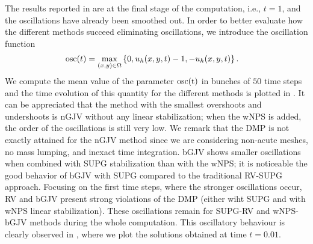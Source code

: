 The results reported in  are at the final stage of the computation, i.e., $t=1$, and the oscillations have already been smoothed out. In order to better evaluate how the different methods succeed eliminating oscillations, we introduce the oscillation function
\begin{align*}
&{\rm osc}(t) = \max_{(x,y)\in \Omega} \left\{0 , u_h(x,y,t) - 1 , -u_h(x,y,t) \right\}.
\end{align*}
We compute the mean value of the parameter ${\rm osc(t)}$ in bunches of $50$ time steps and the time evolution of this quantity for the different methods is plotted in . It can be appreciated that the method with the smallest overshoots and undershoots is nGJV without any linear stabilization; when the wNPS is added, the order of the oscillations is still very low. We remark that the DMP is not exactly attained for the nGJV method since we are considering non-acute meshes, no mass lumping, and inexact time integration. bGJV shows smaller oscillations when combined with SUPG stabilization than with the wNPS; it is noticeable the good behavior of bGJV with SUPG compared to the traditional RV-SUPG approach. Focusing on the first time steps, where the stronger oscillations occur, RV and bGJV present strong violations of the DMP (either wiht SUPG and with wNPS linear stabilization). These oscillations remain for SUPG-RV and wNPS-bGJV methods during the whole computation. This oscillatory behaviour is clearly observed  in , where we plot the solutions obtained  at time $t=0.01$. 

